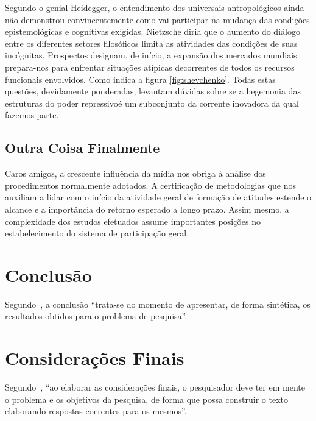 \documentclass[font=plain,chapter=TITLE,section=Title,espaco=duplo,tocpage=plain,appendix=Name,floatnumber=continuous]{abnt}
\begin{document}
Segundo o genial Heidegger, o entendimento dos universais antropológicos
ainda não demonstrou convincentemente como vai participar na mudança das
condições epistemológicas e cognitivas exigidas. Nietzsche diria que o
aumento do diálogo entre os diferentes setores filosóficos limita as
atividades das condições de suas incógnitas. Prospectos designam, de
início, a expansão dos mercados mundiais prepara-nos para enfrentar
situações atípicas decorrentes de todos os recursos funcionais envolvidos.
Como indica a figura \ref{fig:shevchenko}. Todas estas questões,
devidamente ponderadas, levantam dúvidas sobre se a hegemonia das
estruturas do poder repressivoé um subconjunto da corrente inovadora da
qual fazemos parte.

\section{Outra Coisa Finalmente}

Caros amigos, a crescente influência da mídia nos obriga à análise dos
procedimentos normalmente adotados. A certificação de metodologias que nos
auxiliam a lidar com o início da atividade geral de formação de atitudes
estende o alcance e a importância do retorno esperado a longo prazo. Assim
mesmo, a complexidade dos estudos efetuados assume importantes posições no
estabelecimento do sistema de participação geral.

\chapter{Conclusão}

Segundo~\cite{normasUTP}, a conclusão “trata-se do momento de apresentar,
de forma sintética, os resultados obtidos para o problema de pesquisa”.

\chapter{Considerações Finais}

Segundo~\cite{normasUTP}, “ao elaborar as considerações finais, o
pesquisador deve ter em mente o problema e os objetivos da pesquisa, de
forma que possa construir o texto elaborando respostas coerentes para os
mesmos”.


\end{document}
